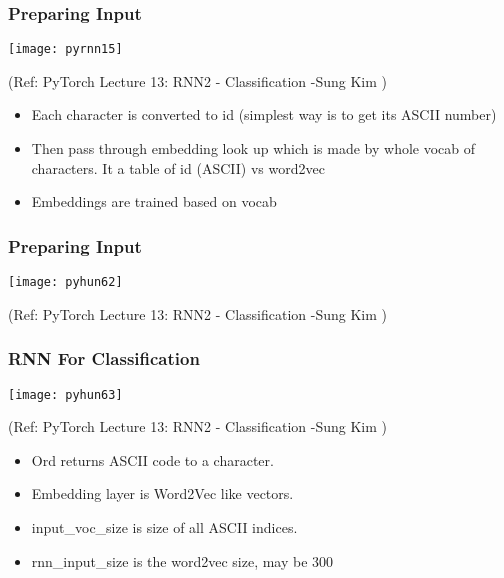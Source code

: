 \begin{frame}[fragile] \frametitle{Preparing Input}

 
\begin{center}
\texttt{[image: pyrnn15]}

\tiny{(Ref:  PyTorch Lecture 13: RNN2 - Classification -Sung Kim )}
\end{center}
\begin{itemize}
\item Each character is converted to id (simplest way is to get its ASCII number)
\item Then pass through embedding look up which is made by whole vocab of characters. It a table of id (ASCII) vs word2vec
\item Embeddings are trained based on vocab
\end{itemize}

\end{frame}

\begin{frame}[fragile] \frametitle{Preparing Input}

\begin{center}
\texttt{[image: pyhun62]}

\tiny{(Ref:  PyTorch Lecture 13: RNN2 - Classification -Sung Kim )}
\end{center}


\end{frame}

\begin{frame}[fragile] \frametitle{RNN For Classification}

\begin{center}
\texttt{[image: pyhun63]}

\tiny{(Ref:  PyTorch Lecture 13: RNN2 - Classification -Sung Kim )}
\end{center}

\begin{itemize}
\item Ord returns ASCII code to a character. 
\item Embedding layer is Word2Vec like vectors.
\item input\_voc\_size is size of all ASCII indices.
\item rnn\_input\_size is the word2vec size, may be 300
\end{itemize}
\end{frame}


